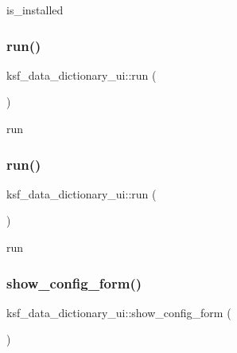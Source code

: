 is\+\_\+installed \hypertarget{classksf__data__dictionary__ui_a718a382712dc59fe7541a6dc77c5d1c0}{}\label{classksf__data__dictionary__ui_a718a382712dc59fe7541a6dc77c5d1c0} 
\subsubsection{\texorpdfstring{run()}{run()}\hspace{0.1cm}{\footnotesize\ttfamily [1/2]}}
{\footnotesize\ttfamily ksf\+\_\+data\+\_\+dictionary\+\_\+ui\+::run (\begin{DoxyParamCaption}{ }\end{DoxyParamCaption})}

run \hypertarget{classksf__data__dictionary__ui_a718a382712dc59fe7541a6dc77c5d1c0}{}\label{classksf__data__dictionary__ui_a718a382712dc59fe7541a6dc77c5d1c0} 
\subsubsection{\texorpdfstring{run()}{run()}\hspace{0.1cm}{\footnotesize\ttfamily [2/2]}}
{\footnotesize\ttfamily ksf\+\_\+data\+\_\+dictionary\+\_\+ui\+::run (\begin{DoxyParamCaption}{ }\end{DoxyParamCaption})}

run \hypertarget{classksf__data__dictionary__ui_a3c01247145824cdf9ad196e2c1e1ad80}{}\label{classksf__data__dictionary__ui_a3c01247145824cdf9ad196e2c1e1ad80} 
\subsubsection{\texorpdfstring{show\+\_\+config\+\_\+form()}{show\_config\_form()}\hspace{0.1cm}{\footnotesize\ttfamily [1/2]}}
{\footnotesize\ttfamily ksf\+\_\+data\+\_\+dictionary\+\_\+ui\+::show\+\_\+config\+\_\+form (\begin{DoxyParamCaption}{ }\end{DoxyParamCaption})}

